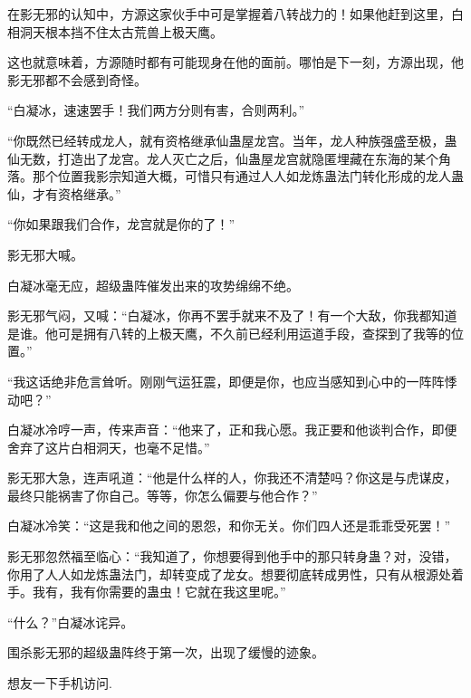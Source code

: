 \begin{this_body}
在影无邪的认知中，方源这家伙手中可是掌握着八转战力的！如果他赶到这里，白相洞天根本挡不住太古荒兽上极天鹰。

这也就意味着，方源随时都有可能现身在他的面前。哪怕是下一刻，方源出现，他影无邪都不会感到奇怪。

“白凝冰，速速罢手！我们两方分则有害，合则两利。”

“你既然已经转成龙人，就有资格继承仙蛊屋龙宫。当年，龙人种族强盛至极，蛊仙无数，打造出了龙宫。龙人灭亡之后，仙蛊屋龙宫就隐匿埋藏在东海的某个角落。那个位置我影宗知道大概，可惜只有通过人人如龙炼蛊法门转化形成的龙人蛊仙，才有资格继承。”

“你如果跟我们合作，龙宫就是你的了！”

影无邪大喊。

白凝冰毫无应，超级蛊阵催发出来的攻势绵绵不绝。

影无邪气闷，又喊：“白凝冰，你再不罢手就来不及了！有一个大敌，你我都知道是谁。他可是拥有八转的上极天鹰，不久前已经利用运道手段，查探到了我等的位置。”

“我这话绝非危言耸听。刚刚气运狂震，即便是你，也应当感知到心中的一阵阵悸动吧？”

白凝冰冷哼一声，传来声音：“他来了，正和我心愿。我正要和他谈判合作，即便舍弃了这片白相洞天，也毫不足惜。”

影无邪大急，连声吼道：“他是什么样的人，你我还不清楚吗？你这是与虎谋皮，最终只能祸害了你自己。等等，你怎么偏要与他合作？”

白凝冰冷笑：“这是我和他之间的恩怨，和你无关。你们四人还是乖乖受死罢！”

影无邪忽然福至临心：“我知道了，你想要得到他手中的那只转身蛊？对，没错，你用了人人如龙炼蛊法门，却转变成了龙女。想要彻底转成男性，只有从根源处着手。我有，我有你需要的蛊虫！它就在我这里呢。”

“什么？”白凝冰诧异。

围杀影无邪的超级蛊阵终于第一次，出现了缓慢的迹象。

想友一下手机访问.

\end{this_body}

